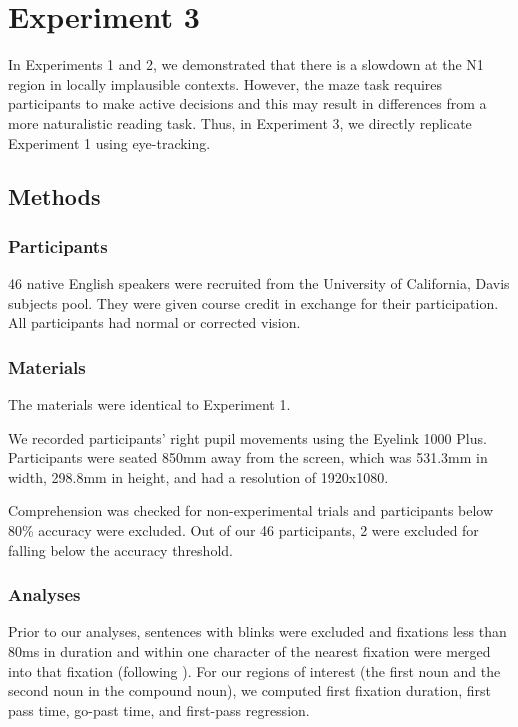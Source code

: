 \documentclass[
  12pt,
  letterpaper,
]{scrreprt}
\begin{document}
\section{Experiment 3}\label{experiment-3}

In Experiments 1 and 2, we demonstrated that there is a slowdown at the
N1 region in locally implausible contexts. However, the maze task
requires participants to make active decisions and this may result in
differences from a more naturalistic reading task. Thus, in Experiment
3, we directly replicate Experiment 1 using eye-tracking.

\subsection{Methods}\label{methods-2}

\subsubsection{Participants}\label{participants-2}

46 native English speakers were recruited from the University of
California, Davis subjects pool. They were given course credit in
exchange for their participation. All participants had normal or
corrected vision.

\subsubsection{Materials}\label{materials}

The materials were identical to Experiment 1.

We recorded participants' right pupil movements using the Eyelink 1000
Plus. Participants were seated 850mm away from the screen, which was
531.3mm in width, 298.8mm in height, and had a resolution of 1920x1080.

Comprehension was checked for non-experimental trials and participants
below 80\% accuracy were excluded. Out of our 46 participants, 2 were
excluded for falling below the accuracy threshold.

\subsubsection{Analyses}\label{analyses}

Prior to our analyses, sentences with blinks were excluded and fixations
less than 80ms in duration and within one character of the nearest
fixation were merged into that fixation (following
). For
our regions of interest (the first noun and the second noun in the
compound noun), we computed first fixation duration, first pass time,
go-past time, and first-pass regression.
\end{document}
